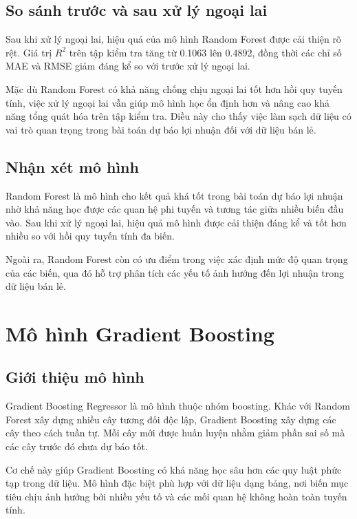 \subsection*{\thesubsection\quad So sánh trước và sau xử lý ngoại lai}

Sau khi xử lý ngoại lai, hiệu quả của mô hình Random Forest được cải thiện rõ rệt. Giá trị \(R^2\) trên tập kiểm tra tăng từ 0.1063 lên 0.4892, đồng thời các chỉ số MAE và RMSE giảm đáng kể so với trước xử lý ngoại lai.

Mặc dù Random Forest có khả năng chống chịu ngoại lai tốt hơn hồi quy tuyến tính, việc xử lý ngoại lai vẫn giúp mô hình học ổn định hơn và nâng cao khả năng tổng quát hóa trên tập kiểm tra. Điều này cho thấy việc làm sạch dữ liệu có vai trò quan trọng trong bài toán dự báo lợi nhuận đối với dữ liệu bán lẻ.

\subsection*{\thesubsection\quad Nhận xét mô hình}

Random Forest là mô hình cho kết quả khá tốt trong bài toán dự báo lợi nhuận nhờ khả năng học được các quan hệ phi tuyến và tương tác giữa nhiều biến đầu vào. Sau khi xử lý ngoại lai, hiệu quả mô hình được cải thiện đáng kể và tốt hơn nhiều so với hồi quy tuyến tính đa biến.

Ngoài ra, Random Forest còn có ưu điểm trong việc xác định mức độ quan trọng của các biến, qua đó hỗ trợ phân tích các yếu tố ảnh hưởng đến lợi nhuận trong dữ liệu bán lẻ.

\section{Mô hình Gradient Boosting}

\subsection*{\thesubsection\quad Giới thiệu mô hình}

Gradient Boosting Regressor là mô hình thuộc nhóm boosting. Khác với Random Forest xây dựng nhiều cây tương đối độc lập, Gradient Boosting xây dựng các cây theo cách tuần tự. Mỗi cây mới được huấn luyện nhằm giảm phần sai số mà các cây trước đó chưa dự báo tốt.

Cơ chế này giúp Gradient Boosting có khả năng học sâu hơn các quy luật phức tạp trong dữ liệu. Mô hình đặc biệt phù hợp với dữ liệu dạng bảng, nơi biến mục tiêu chịu ảnh hưởng bởi nhiều yếu tố và các mối quan hệ không hoàn toàn tuyến tính.

